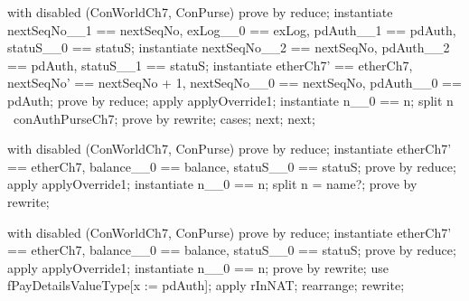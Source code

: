 \begin{LPScript}\begin{zproof}[tConcStartToOkayPRE]
    with disabled (ConWorldCh7, ConPurse) prove by reduce;
    instantiate nextSeqNo\_\_1 == nextSeqNo,
        exLog\_\_0 == exLog, pdAuth\_\_1 == pdAuth,
        statuS\_\_0 == statuS;
    instantiate nextSeqNo\_\_2 == nextSeqNo,
        pdAuth\_\_2 == pdAuth, statuS\_\_1 == statuS;
    instantiate etherCh7' == etherCh7, nextSeqNo' == nextSeqNo + 1,
        nextSeqNo\_\_0 == nextSeqNo, pdAuth\_\_0 == pdAuth;
    prove by reduce;
    apply applyOverride1;
    instantiate n\_\_0 == n;
    split n \in \dom~conAuthPurseCh7;
    prove by rewrite;
    cases;
    next;
    next;
\end{zproof}\end{LPScript}

\begin{LPScript}\begin{zproof}[tConcReqOkayPRE]
    with disabled (ConWorldCh7, ConPurse) prove by reduce;
    instantiate etherCh7' == etherCh7, balance\_\_0 == balance,
        statuS\_\_0 == statuS;
    prove by reduce;
    apply applyOverride1;
    instantiate n\_\_0 == n;
    split n = name?;
    prove by rewrite;
\end{zproof}\end{LPScript}

\begin{LPScript}\begin{zproof}[tConcValOkayPRE]
    with disabled (ConWorldCh7, ConPurse) prove by reduce;
    instantiate etherCh7' == etherCh7, balance\_\_0 == balance,
        statuS\_\_0 == statuS;
    prove by reduce;
    apply applyOverride1;
    instantiate n\_\_0 == n;
    prove by rewrite;
    use fPayDetailsValueType[x := pdAuth];
    apply rInNAT;
    rearrange;
    rewrite;
\end{zproof}\end{LPScript}

